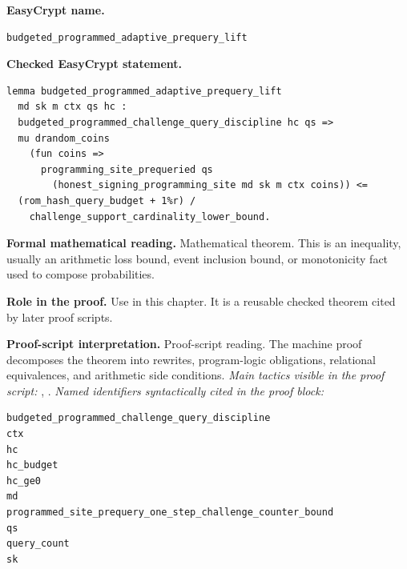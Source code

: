 \begin{formaltheorem}
\noindent\textbf{EasyCrypt name.}
\begin{lstlisting}[language=EasyCrypt,basicstyle=\ttfamily\scriptsize]
budgeted_programmed_adaptive_prequery_lift
\end{lstlisting}
\noindent\textbf{Checked EasyCrypt statement.}
\begin{lstlisting}[language=EasyCrypt,basicstyle=\ttfamily\scriptsize]
lemma budgeted_programmed_adaptive_prequery_lift
  md sk m ctx qs hc :
  budgeted_programmed_challenge_query_discipline hc qs =>
  mu drandom_coins
    (fun coins =>
      programming_site_prequeried qs
        (honest_signing_programming_site md sk m ctx coins)) <=
  (rom_hash_query_budget + 1%r) /
    challenge_support_cardinality_lower_bound.
\end{lstlisting}
\noindent\textbf{Formal mathematical reading.}
Mathematical theorem. This is an inequality, usually an arithmetic loss bound, event inclusion bound, or monotonicity fact used to compose probabilities.

\noindent\textbf{Role in the proof.}
Use in this chapter. It is a reusable checked theorem cited by later proof scripts.

\noindent\textbf{Proof-script interpretation.}
Proof-script reading. The machine proof decomposes the theorem into rewrites, program-logic obligations, relational equivalences, and arithmetic side conditions.
\emph{Main tactics visible in the proof script:} , .
\emph{Named identifiers syntactically cited in the proof block:}
\begin{lstlisting}[language=EasyCrypt,basicstyle=\ttfamily\scriptsize]
budgeted_programmed_challenge_query_discipline
ctx
hc
hc_budget
hc_ge0
md
programmed_site_prequery_one_step_challenge_counter_bound
qs
query_count
sk
\end{lstlisting}

\end{formaltheorem}

